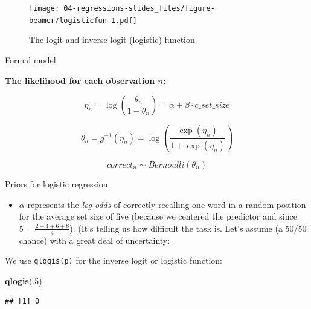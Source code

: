 \documentclass[12pt,ignorenonframetext,aspectratio=169]{beamer}
\newenvironment{Shaded}{\begin{snugshade}}{\end{snugshade}}
\newcommand{\DecValTok}[1]{\textcolor[rgb]{0.00,0.00,0.81}{#1}}
\newcommand{\KeywordTok}[1]{\textcolor[rgb]{0.13,0.29,0.53}{\textbf{#1}}}
\newcommand{\NormalTok}[1]{#1}
\providecommand{\tightlist}{%
  \setlength{\itemsep}{0pt}\setlength{\parskip}{0pt}}
\begin{document}
\begin{frame}

\small

\begin{figure}
\centering
\texttt{[image: 04-regressions-slides\_files/figure-beamer/logisticfun-1.pdf]}
\caption{\label{fig:logisticfun}The logit and inverse logit (logistic) function.}
\end{figure}

\normalsize

\end{frame}

\begin{frame}{Formal model}
\protect\hypertarget{formal-model-3}{}

\textbf{The likelihood for each observation \(n\):}

\begin{equation}
\eta_n = \log\left(\frac{\theta_n}{1-\theta_n}\right) = \alpha + \beta \cdot c\_set\_size
\end{equation}

\begin{equation}
\theta_n = g^{-1}(\eta_n) =  \log\left(\frac{\exp(\eta_n)}{1+\exp(\eta_n)}\right)
\end{equation}

\begin{equation}
correct_n \sim Bernoulli(\theta_n)
\label{eq:bernoullilogislik}
\end{equation}

\end{frame}

\begin{frame}[fragile]{Priors for logistic regression}
\protect\hypertarget{priors-for-logistic-regression}{}

\begin{itemize}
\tightlist
\item
  \(\alpha\) represents the \emph{log-odds} of correctly recalling one word in a random position for the average set size of five (because we centered the predictor and since \(5 = \frac{2+4+6+8}{4}\)). (It's telling us how difficult the task is. Let's assume (a 50/50 chance) with a great deal of uncertainty:
\end{itemize}

We use \texttt{qlogis(p)} for the inverse logit or logistic function:

\small

\begin{Shaded}
\begin{Highlighting}[]
\KeywordTok{qlogis}\NormalTok{(.}\DecValTok{5}\NormalTok{)}
\end{Highlighting}
\end{Shaded}

\begin{verbatim}
## [1] 0
\end{verbatim}

\normalsize

\end{frame}
\end{document}
